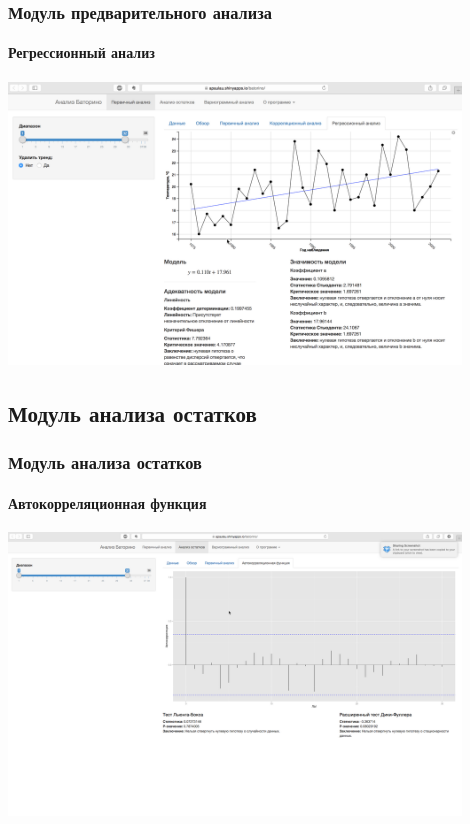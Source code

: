 \documentclass{beamer}
\begin{document}
\begin{frame}
  \frametitle{Модуль предварительного анализа}
  \framesubtitle{Регрессионный анализ}
  \begin{center}
    \includegraphics[width=0.9\textwidth]{../../figures/static/2_regr.png}
  \end{center}
\end{frame}

\subsection{Модуль анализа остатков}
\begin{frame}
  \frametitle{Модуль анализа остатков}
  \framesubtitle{Автокорреляционная функция}
  \begin{center}
    \includegraphics[width=0.9\textwidth]{../../figures/static/3_acf.png}
  \end{center}
\end{frame}
\end{document}
